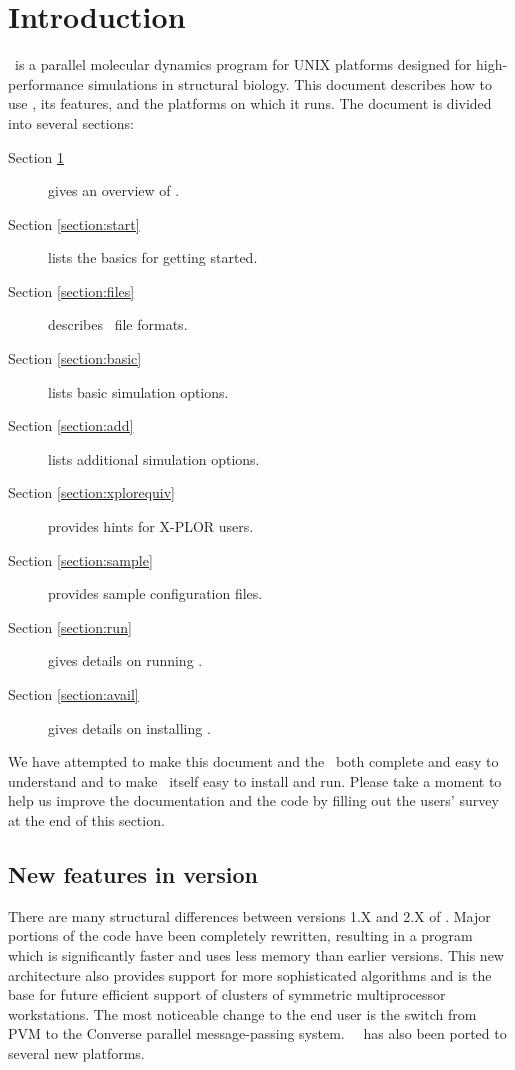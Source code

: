 \section{Introduction}
\label{section:intro}

\NAMD\ is a parallel molecular dynamics program for UNIX 
platforms designed for high-performance 
simulations in structural biology.  This document describes how to use 
\NAMD, its features, and the platforms on which it runs.
The document is divided into several sections:
\begin{description}
\item[Section \ref{section:intro}] gives an overview of \NAMD.
\item[Section \ref{section:start}] lists the basics for getting started.
\item[Section \ref{section:files}] describes \NAMD\ file formats.
\item[Section \ref{section:basic}] lists basic simulation options.
\item[Section \ref{section:add}] lists additional simulation options.
\item[Section \ref{section:xplorequiv}] provides hints for X-PLOR users.
\item[Section \ref{section:sample}] provides sample configuration files.
\item[Section \ref{section:run}] gives details on running \NAMD.
\item[Section \ref{section:avail}] gives details on installing \NAMD.
\end{description}

We have attempted to make this document and the \PG\ both
complete and easy to understand and to make \NAMD\ itself
easy to install and run.  Please take a moment to help us improve
the documentation and the code by filling out the users' survey
at the end of this section.

\subsection{New features in version \NAMDVER}

There are many structural differences between versions 1.X and 2.X of \NAMD.
Major portions of the code have been completely rewritten, resulting in a program which is significantly faster and uses less memory than earlier versions.
This new architecture also provides support for more sophisticated algorithms and is the base for future efficient support of clusters of symmetric multiprocessor workstations.
The most noticeable change to the end user is the switch from PVM to the Converse parallel message-passing system.
\NAMD\ \NAMDVER\ has also been ported to several new platforms.

